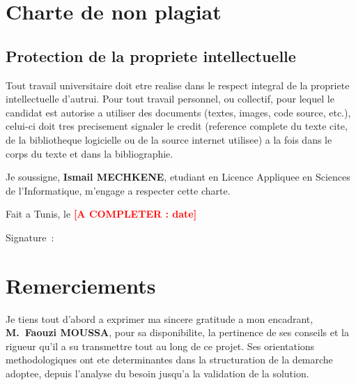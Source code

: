 \documentclass[a4paper,12pt,oneside]{report}
\newcommand{\todo}[1]{\textcolor{red}{\textbf{[A COMPLETER : #1]}}}
\begin{document}
\chapter*{Charte de non plagiat}
\section*{Protection de la propriete intellectuelle}

Tout travail universitaire doit etre realise dans le respect integral de la propriete intellectuelle d'autrui. Pour tout travail personnel, ou collectif, pour lequel le candidat est autorise a utiliser des documents (textes, images, code source, etc.), celui-ci doit tres precisement signaler le credit (reference complete du texte cite, de la bibliotheque logicielle ou de la source internet utilisee) a la fois dans le corps du texte et dans la bibliographie.

\vspace{1cm}

Je soussigne, \textbf{Ismail MECHKENE}, etudiant en Licence Appliquee en Sciences de l'Informatique, m'engage a respecter cette charte.

\vspace{2cm}

\noindent Fait a Tunis, le \todo{date}

\vspace{1.5cm}

\noindent Signature~: \hrulefill

\chapter*{Remerciements}

Je tiens tout d'abord a exprimer ma sincere gratitude a mon encadrant, \textbf{M.~Faouzi MOUSSA}, pour sa disponibilite, la pertinence de ses conseils et la rigueur qu'il a su transmettre tout au long de ce projet. Ses orientations methodologiques ont ete determinantes dans la structuration de la demarche adoptee, depuis l'analyse du besoin jusqu'a la validation de la solution.
\end{document}
